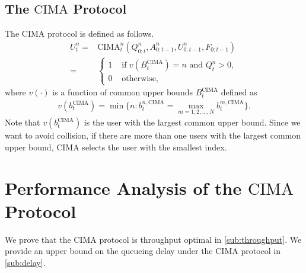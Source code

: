 \documentclass[onecolumn,draftcls]{IEEEtran}
\newcommand{\g}{\text{CIMA}}
\begin{document}
\subsection{The $\g$ Protocol}
\label{sub:ghat}
The $\g$ protocol is defined as follows.
\begin{align}
U^n_t = & \g^n_t(Q^n_{0:t}, A^n_{0:t-1}, U^n_{0:t-1}, F_{0:t-1}) \nonumber\\
      = & \left\{ \begin{array}{ll}
      1 & \text{ if } v(B^{\g}_t) = n \text{ and }Q^n_t >0 ,\\ 
      0 & \text{ otherwise,}
      \end{array}\right.
\label{eq:gmac}
\end{align}
where $v(\cdot)$ is a function of common upper bounds $B^{\g}_t$ defined as
\begin{align*}
v(b^{\g}_t) = \min\{n: b^{n,\g}_t = \max_{m=1,2,\dots,N}b^{m,\g}_t\}.
\end{align*}
Note that $v(b^{\g}_t)$ is the user with the largest common upper bound. Since we want to avoid collision, if there are more than one users with the largest common upper bound, $\g$ selects the user with the smallest index.



\section{Performance Analysis of the $\g$ Protocol}
\label{sec:analysis}
We prove that the $\g$ protocol is throughput optimal in \ref{sub:throughput}.
We provide an upper bound on the queueing delay under the $\g$ protocol in \ref{sub:delay}.
\end{document}

